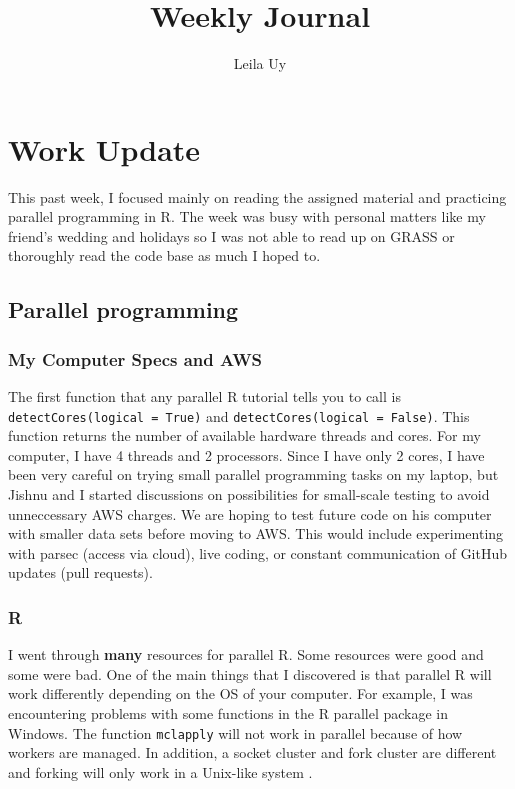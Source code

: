 \documentclass[a4paper,10pt]{article}
\title{Weekly Journal}
\author{Leila Uy}
\begin{document}
\maketitle

% 

\section{Work Update}

This past week, I focused mainly on reading the assigned material and practicing parallel programming in R. The week was busy with personal 
matters like my friend's wedding and holidays so I was not able to read up on GRASS or thoroughly read the code base as much I hoped to.

\subsection{Parallel programming}

\subsubsection{My Computer Specs and AWS}
The first function that any parallel R tutorial tells you to call is \verb|detectCores(logical = True)| and \verb|detectCores(logical = False)|.
This function returns the number of available hardware threads and cores. For my computer, I have 4 threads and 2 processors. Since I have only 
2 cores, I have been very careful on trying small parallel programming tasks on my laptop, but Jishnu and I started discussions on possibilities 
for small-scale testing to avoid unneccessary AWS charges. We are hoping to test future code on his computer with smaller data sets before 
moving to AWS. This would include experimenting with parsec (access via cloud), live coding, or constant communication of GitHub updates 
(pull requests). 

\subsubsection{R}
I went through \textbf{many} resources for parallel R. Some resources were good \cite{gera2020, hallquist2018, martius2020, tinakarimi2020} 
and some were bad. One of the main things that I discovered is that parallel R will work differently depending on the OS of your computer. For example, I was encountering problems with some functions 
in the R parallel package in Windows. The function \verb|mclapply| will not work in parallel because of how workers are managed. In addition, 
a socket cluster and fork cluster are different and forking will only work in a Unix-like system \cite{hallquist2018}.
\end{document}
